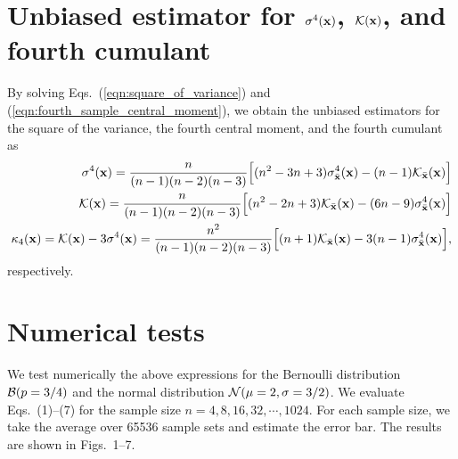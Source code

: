 \documentclass[a4paper]{article}
\newcommand{\xb}{\bar{\bf x}}
\begin{document}
\section{Unbiased estimator for $\sigma^4({\bf x})$, ${\cal K}({\bf x})$, and fourth cumulant}

By solving Eqs.~(\ref{eqn:square_of_variance}) and (\ref{eqn:fourth_sample_central_moment}), we obtain the unbiased estimators for the square of the variance, the fourth central moment, and the fourth cumulant as
\begin{align}
  \begin{split}
    \sigma^4({\bf x}) = \frac{n}{(n-1)(n-2)(n-3)} \Big[ (n^2-3n+3) \sigma_{\xb}^4({\bf x}) - (n-1) {\cal K_{\xb}(\bf x)} \Big]
  \end{split} \\
  \begin{split}
    {\cal K}({\bf x}) = \frac{n}{(n-1)(n-2)(n-3)} \Big[ (n^2-2n+3) {\cal K_{\xb}(\bf x)} - (6n-9) \sigma_{\xb}^4({\bf x}) \Big]
  \end{split} \\
  \begin{split}
    \kappa_4({\bf x}) = {\cal K}({\bf x}) - 3 \sigma^4({\bf x})
    = \frac{n^2}{(n-1)(n-2)(n-3)} \Big[ (n+1) {\cal K_{\xb}(\bf x)} - 3(n-1) \sigma_{\xb}^4({\bf x}) \Big],
  \end{split}
\end{align}
respectively.

\section{Numerical tests}

We test numerically the above expressions for the Bernoulli distribution ${\cal B}(p=3/4)$ and the normal distribution ${\cal N}(\mu=2,\sigma=3/2)$. We evaluate Eqs.~(1)--(7) for the sample size $n=4,8,16,32,\cdots,1024$. For each sample size, we take the average over 65536 sample sets and estimate the error bar. The results are shown in Figs.~1--7.




\clearpage
\end{document}
